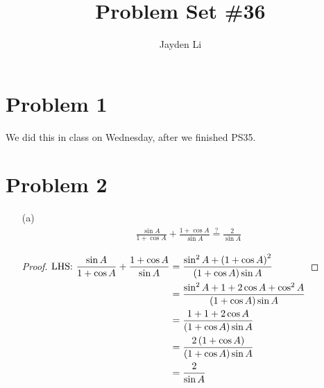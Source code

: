 \documentclass{article}
\title{Problem Set \#36}
\author{Jayden Li}
\begin{document}
\maketitle

\fontsize{12pt}{12pt}\selectfont

\section*{Problem 1}
We did this in class on Wednesday, after we finished PS35.

\section*{Problem 2}
\begin{itemize}
\item[(a)]
	\begin{gather*}
		\frac{\sin A}{1+\cos A}+\frac{1+\cos A}{\sin A}
		\stackrel{?}{=}\frac{2}{\sin A}
	\end{gather*}
	\begin{proof}
		$\begin{aligned}[t]
			\text{LHS: }
			\frac{\sin A}{1+\cos A}+\frac{1+\cos A}{\sin A}
			&=\frac{\sin^2A+\left(1+\cos A\right)^2}
				{\left(1+\cos A\right)\sin A} \\
			&=\frac{\sin^2A+1+2\cos A+\cos^2A}
				{\left(1+\cos A\right)\sin A} \\
			&=\frac{1+1+2\cos A}
				{\left(1+\cos A\right)\sin A} \\
			&=\frac{2\left(1+\cos A\right)}
				{\left(1+\cos A\right)\sin A} \\
			&=\frac{2}{\sin A} \\
		\end{aligned} \\$
	\end{proof}


\end{itemize}
\end{document}
